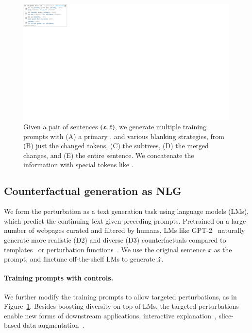 \begin{figure}[t]
\centering
\includegraphics[trim={0 30.5cm 53.2cm 0cm}, clip, width=1\columnwidth]{figures/blank}
\vspace{-15pt}
\caption{Given a pair of sentences $(x, \hat{x})$, we generate multiple training prompts with (A) a primary \tagstr, and various blanking strategies, from (B) just the changed tokens, (C) the subtrees, (D) the merged changes, and (E) the entire sentence.
We concatenate the information with special tokens like \perturbtoken.
}
\vspace{-10pt}
\label{fig:blank}
\end{figure}

\subsection{Counterfactual generation as NLG}

We form the perturbation as a text generation task using language models (LMs), which predict the continuing text given preceding prompts.
Pretrained on a large number of webpages curated and filtered by humans, LMs like GPT-2~\cite{radford2019language} naturally generate more realistic (D2) and diverse (D3) counterfactuals compared to templates~\cite{ribeiro2018sear} or perturbation functions~\cite{wu2019errudite}.
We use the original sentence $x$ as the prompt, and finetune off-the-shelf LMs to generate $\hat{x}$.

\paragraph{Training prompts with controls.}
We further modify the training prompts to allow targeted perturbations, as in Figure~\ref{fig:blank}.
Besides boosting diversity on top of LMs, the targeted perturbations enable new forms of downstream applications, \eg interactive explanation~\cite{miller}, slice-based data augmentation~\cite{chen2019slice}.

